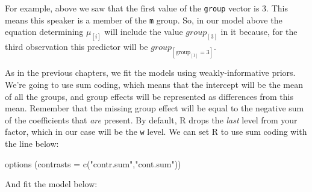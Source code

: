 \documentclass[
]{book}
\newenvironment{Shaded}{\begin{snugshade}}{\end{snugshade}}
\newcommand{\AttributeTok}[1]{\textcolor[rgb]{0.77,0.63,0.00}{#1}}
\newcommand{\FunctionTok}[1]{\textcolor[rgb]{0.00,0.00,0.00}{#1}}
\newcommand{\NormalTok}[1]{#1}
\newcommand{\StringTok}[1]{\textcolor[rgb]{0.31,0.60,0.02}{#1}}
\begin{document}
For example, above we saw that the first value of the \texttt{group} vector is 3. This means this speaker is a member of the \texttt{m} group. So, in our model above the equation determining \(\mu_{[i]}\) will include the value \(group_{[3]}\) in it because, for the third observation this predictor will be \(group_{[\mathrm{group}_{[1]}=3]}\).

As in the previous chapters, we fit the models using weakly-informative priors. We're going to use sum coding, which means that the intercept will be the mean of all the groups, and group effects will be represented as differences from this mean. Remember that the missing group effect will be equal to the negative sum of the coefficients that \emph{are} present. By default, R drops the \emph{last} level from your factor, which in our case will be the \texttt{w} level. We can set R to use sum coding with the line below:

\begin{Shaded}
\begin{Highlighting}[]
\FunctionTok{options}\NormalTok{ (}\AttributeTok{contrasts =} \FunctionTok{c}\NormalTok{(}\StringTok{"contr.sum"}\NormalTok{,}\StringTok{"cont.sum"}\NormalTok{))}
\end{Highlighting}
\end{Shaded}

And fit the model below:
\end{document}
